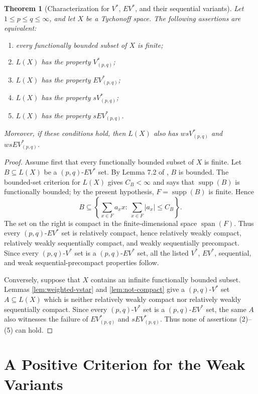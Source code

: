\documentclass[11pt]{article}
\newtheorem{theorem}{Theorem}
\newcommand{\supp}{\operatorname{supp}}
\newcommand{\spn}{\operatorname{span}}
\newcommand{\Vstar}{V^\ast}
\newcommand{\EVstar}{EV^\ast}
\begin{document}
\begin{theorem}[Characterization for \(V^\ast\), \(EV^\ast\), and their sequential variants]
\label{thm:main}
Let \(1\le p\le q\le\infty\), and let \(X\) be a Tychonoff space. The
following assertions are equivalent:
\begin{enumerate}
\item every functionally bounded subset of \(X\) is finite;
\item \(L(X)\) has the property \(\Vstar_{(p,q)}\);
\item \(L(X)\) has the property \(\EVstar_{(p,q)}\);
\item \(L(X)\) has the property \(s\Vstar_{(p,q)}\);
\item \(L(X)\) has the property \(s\EVstar_{(p,q)}\).
\end{enumerate}
Moreover, if these conditions hold, then \(L(X)\) also has
\(ws\Vstar_{(p,q)}\) and \(ws\EVstar_{(p,q)}\).
\end{theorem}

\begin{proof}
Assume first that every functionally bounded subset of \(X\) is finite.
Let \(B\subseteq L(X)\) be a \((p,q)\)-\(\EVstar\) set. By Lemma 7.2 of
\cite{Gab2024Pel}, \(B\) is bounded. The bounded-set criterion for
\(L(X)\) gives \(C_B<\infty\) and says that \(\supp(B)\) is functionally
bounded; by the present hypothesis, \(F=\supp(B)\) is finite. Hence
\[
  B\subseteq
  \left\{\sum_{x\in F}a_xx:\ \sum_{x\in F}|a_x|\le C_B\right\}.
\]
The set on the right is compact in the finite-dimensional space
\(\spn(F)\). Thus every \((p,q)\)-\(\EVstar\) set is relatively compact,
hence relatively weakly compact, relatively weakly sequentially compact,
and weakly sequentially precompact. Since every \((p,q)\)-\(\Vstar\) set
is a \((p,q)\)-\(\EVstar\) set, all the listed \(V^\ast\), \(EV^\ast\),
sequential, and weak sequential-precompact properties follow.

Conversely, suppose that \(X\) contains an infinite functionally bounded
subset. Lemmas \ref{lem:weighted-vstar} and \ref{lem:not-compact} give a
\((p,q)\)-\(\Vstar\) set \(A\subseteq L(X)\) which is neither relatively
weakly compact nor relatively weakly sequentially compact. Since every
\((p,q)\)-\(\Vstar\) set is a \((p,q)\)-\(\EVstar\) set, the same \(A\)
also witnesses the failure of \(\EVstar_{(p,q)}\) and
\(s\EVstar_{(p,q)}\). Thus none of assertions (2)--(5) can hold.
\end{proof}

\section*{A Positive Criterion for the Weak Variants}
\end{document}
